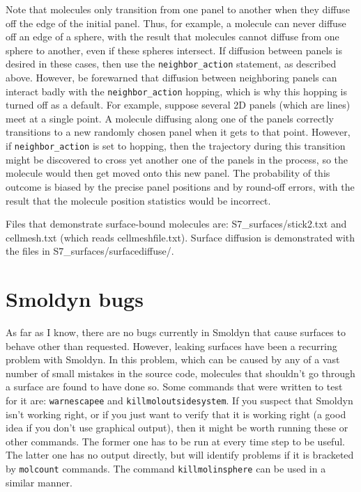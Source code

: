 \documentclass {book}
\newcommand {\ttt} {\texttt}
\begin{document}
Note that molecules only transition from one panel to another when they diffuse off the edge of the initial panel. Thus, for example, a molecule can never diffuse off an edge of a sphere, with the result that molecules cannot diffuse from one sphere to another, even if these spheres intersect. If diffusion between panels is desired in these cases, then use the \ttt{neighbor\_action} statement, as described above. However, be forewarned that diffusion between neighboring panels can interact badly with the \ttt{neighbor\_action} hopping, which is why this hopping is turned off as a default. For example, suppose several 2D panels (which are lines) meet at a single point. A molecule diffusing along one of the panels correctly transitions to a new randomly chosen panel when it gets to that point. However, if \ttt{neighbor\_action} is set to hopping, then the trajectory during this transition might be discovered to cross yet another one of the panels in the process, so the molecule would then get moved onto this new panel. The probability of this outcome is biased by the precise panel positions and by round-off errors, with the result that the molecule position statistics would be incorrect.

Files that demonstrate surface-bound molecules are: S7\_surfaces/stick2.txt and cellmesh.txt (which reads cellmeshfile.txt). Surface diffusion is demonstrated with the files in S7\_surfaces/surfacediffuse/.

\section{Smoldyn bugs}

As far as I know, there are no bugs currently in Smoldyn that cause surfaces to behave other than requested. However, leaking surfaces have been a recurring problem with Smoldyn. In this problem, which can be caused by any of a vast number of small mistakes in the source code, molecules that shouldn't go through a surface are found to have done so. Some commands that were written to test for it are: \ttt{warnescapee} and \ttt{killmoloutsidesystem}. If you suspect that Smoldyn isn't working right, or if you just want to verify that it is working right (a good idea if you don't use graphical output), then it might be worth running these or other commands. The former one has to be run at every time step to be useful. The latter one has no output directly, but will identify problems if it is bracketed by \ttt{molcount} commands. The command \ttt{killmolinsphere} can be used in a similar manner.
\end{document}
